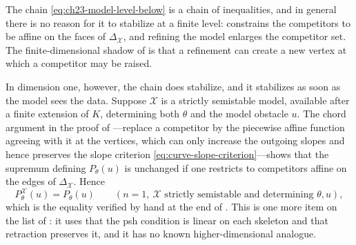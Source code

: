 \begin{remark}
\label{rem:ch23-model-dependence}
The chain \eqref{eq:ch23-model-level-below} is a chain of inequalities, and
in general there is no reason for it to stabilize at a finite level:
 constrains the competitors to be affine
on the faces of \(\Delta_{\mathcal X}\), and refining the model enlarges the
competitor set.  The finite-dimensional shadow of
 is that a refinement can create a new vertex
at which a competitor may be raised.

In dimension one, however, the chain does stabilize, and it stabilizes as
soon as the model sees the data.  Suppose \(\mathcal X\) is a strictly
semistable model, available after a finite extension of \(K\), determining
both \(\theta\) and the model obstacle \(u\).  The chord argument in the
proof of ---replace a competitor
by the piecewise affine function agreeing with it at the vertices, which can
only increase the outgoing slopes and hence preserves the slope criterion
\eqref{eq:curve-slope-criterion}---shows that the supremum defining
\(P_\theta(u)\) is unchanged if one restricts to competitors affine on the
edges of \(\Delta_{\mathcal X}\).  Hence
\[
 P^{\mathcal X}_\theta(u)=P_\theta(u)
 \qquad(n=1,\ \mathcal X\text{ strictly semistable and determining }
 \theta,u),
\]
which is the equality verified by hand at the end of
.  This is one more item on the list of
: it uses that the psh condition is linear
on each skeleton and that retraction preserves it, and it has no known
higher-dimensional analogue.
\end{remark}

